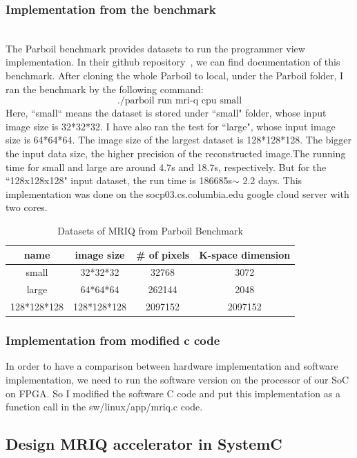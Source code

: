 \documentclass{sig-alternate}
\begin{document}
\subsubsection{Implementation from the benchmark}
\\
The Parboil benchmark provides datasets to run the programmer view implementation. In their github repository~\cite{Rub1}, we can find documentation of this benchmark. After cloning the whole Parboil to local, under the Parboil folder, I ran the benchmark by the following command:
$$\text{./parboil run mri-q cpu small}$$
Here, ``small“ means the dataset is stored under ``small" folder, whose input image size is 32*32*32. I have also ran the test for ``large", whose input image size is 64*64*64. The image size of the largest dataset is 128*128*128.  The bigger the input data size, the higher precision of the reconstructed image.The running time for small and large are around 4.7s and 18.7s, respectively. But for the ``128x128x128" input dataset, the run time is 186685s$ \sim$ 2.2 days. This implementation was done on the socp03.cs.columbia.edu google cloud server with two cores.
\begin{table}[]
    \centering
    \begin{tabular}{c|c|c|c}
    \hline
    \hline
       name  & image size & \# of pixels & K-space dimension  \\
        \hline
    \hline
        small  & 32*32*32 & 32768 & 3072 \\
        large & 64*64*64 & 262144 & 2048\\
        128*128*128 & 128*128*128 & 2097152 & 2097152\\
        \hline
        \hline
    \end{tabular}
    \caption{Datasets of MRIQ from Parboil Benchmark}
    \label{tab-1}
\end{table}
\subsubsection{Implementation from modified c code}
In order to have a comparison between hardware implementation and software implementation, we need to run the software version on the processor of our SoC on FPGA. So I modified the software C code and put this implementation as a function call in the sw/linux/app/mriq.c code.\\

\subsection{Design MRIQ accelerator in SystemC}
\end{document}
